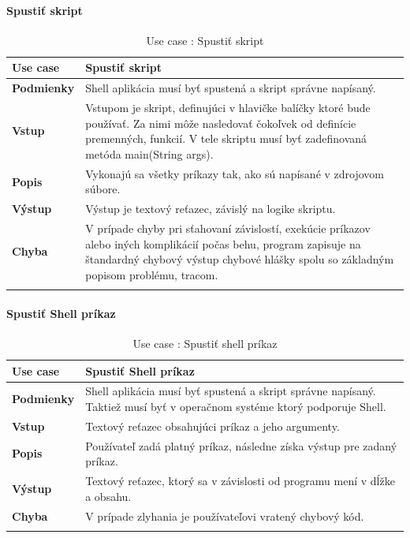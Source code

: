 \paragraph{Spustiť skript}
\begin{center}
	\begin{longtable}{|p{2.5cm}|p{12.2cm}|}
		\hline
		\textbf{Use case} & Spustiť skript \\ 
		\hline
		\textbf{Podmienky} & Shell aplikácia musí byť spustená a skript správne napísaný.\\ 
		\hline
		\textbf{Vstup} & Vstupom je skript, definujúci v hlavičke balíčky ktoré bude používať. Za nimi môže nasledovať čokoľvek od definície premenných, funkcií. V tele skriptu musí byť zadefinovaná metóda main(String args).\\
		\hline
		\textbf{Popis} & Vykonajú sa všetky príkazy tak, ako sú napísané v zdrojovom súbore. \\ 
		\hline
		\textbf{Výstup} & Výstup je textový reťazec, závislý na logike skriptu.\\
		\hline
		\textbf{Chyba} & V prípade chyby pri sťahovaní závislostí, exekúcie príkazov alebo iných komplikácií počas behu, program zapisuje na štandardný chybový výstup chybové hlášky spolu so základným popisom problému, tracom.\\
		\hline
		\caption{Use case : Spustiť skript}
		\label{table:1}
	\end{longtable}

\end{center}

\paragraph{Spustiť Shell príkaz}
\begin{center}
	\begin{longtable}{|p{2.5cm}|p{12.2cm}|}

			\hline
			\textbf{Use case} & Spustiť Shell príkaz \\ 
			\hline
			\textbf{Podmienky} & Shell aplikácia musí byť spustená a skript správne napísaný. Taktiež musí byť v operačnom systéme ktorý podporuje Shell. \\ 
			\hline
			\textbf{Vstup} & Textový reťazec obsahujúci príkaz a jeho argumenty.\\
			\hline
			\textbf{Popis} & Používateľ zadá platný príkaz, následne získa výstup pre zadaný príkaz. \\ 
			\hline
			\textbf{Výstup} &Textový reťazec, ktorý sa v závislosti od programu mení v dĺžke a obsahu. \\
			\hline
			\textbf{Chyba} & V prípade zlyhania je používateľovi vratený chybový kód.\\
			\hline
		\caption{Use case : Spustiť shell príkaz}
	\label{table:1}
	
	\end{longtable}
\end{center}

